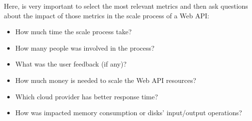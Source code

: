 \documentclass[10pt,article]{IEEEtran}
\begin{document}
Here, is very important to select the most relevant metrics and then ask questions about the impact of those metrics in the scale process of a Web API:
\begin{itemize}
    \item
    How much time the scale process take?
    \item
    How many people was involved in the process?
    \item
    What was the user feedback (if any)?
    \item
    How much money is needed to scale the Web API resources?
    \item
    Which cloud provider has better response time?
    \item
    How was impacted memory consumption or disks' input/output operations? 
\end{itemize}






%
%

\end{document}
